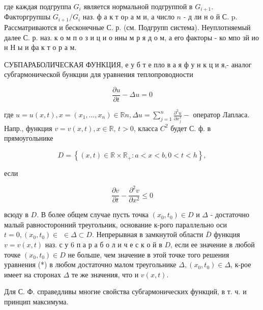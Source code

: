 \documentclass[10pt]{article}
\begin{document}
где каждая подгруппа $G_{i}$ является нормальной подгруппой в $G_{i+1}$. Факторгрупшы $G_{i+1} / G_{i}$ наз. ф а к т о$\mathrm{p}$ а м и, а число $n$ - д ли н о й С. p. Рассматриваются и бесконечные С. р. (см. Подгрупп система). Неуплотняемый далее С. р. наз. к о м п о з и ц и о нны м р я д о м, а его факторы - ко мпо зй ио н Н ы и фа к т о р а м.



СУБПАРАБОЛИЧЕСКАЯ ФУНКЦИЯ, е у б т е пло в а я ф у н к ц и я,- аналог субгармонической бункции для уравнения теплопроводности



\[

\frac{\partial u}{\partial t}-\Delta u=0

\]



где $u=u(x, t), x=\left(x_{1}, \ldots, x_{n}\right) \in \mathbb{R} n, \Delta u=\sum_{j=1}^{n} \frac{\partial^{2} u}{\partial x_{j}^{2}}-$ оператор Лапласа. Напр., функция $v=v(x, t), x \in \mathbb{R}$, $t>0$, класса $C^{2}$ будет С. ф. в прямоугольнике



\[

D=\left\{(x, t) \in \mathbb{R} \times \mathbb{R}_{+}: a<x<b, 0<t<h\right\},

\]



если



\[

\frac{\partial v}{\partial t}-\frac{\partial^{2} v}{\partial x^{2}} \leq 0

\]



всюду в $D$. В более общем случае пусть точка $\left(x_{0}, t_{0}\right) \in D$ и $\Delta$ - достаточно малый равносторонний треугольник, основание к-рого параллельно оси $t=0,\left(x_{0}, t_{0}\right) \in$ $\in \Delta \subset D$. Непрерывная в замкнутой области $\bar{D}$ функция $v=v(x, t)$ наз. с у 6 п а р а б о л и ч е с к о й в $D$, если ее значение в любой точке $\left(x_{0}, t_{0}\right) \in D$ не больше, чем значение в этой точке того решения уравнения (*) в любом достаточно малом треугольнике $\Delta,\left(x_{0}, t_{0}\right) \in \Delta$, к-рое имеет на сторонах $\Delta$ те же значения, что и $v(x, t)$.



Для С. Ф. справедливы многие свойства субгармонических функций, в т. ч. и принцип максимума.
\end{document}
